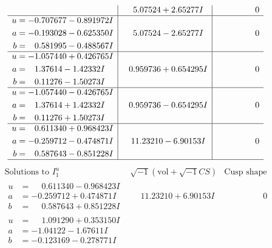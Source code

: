\documentclass[1p]{elsarticle_modified}
\theoremstyle{definition}
\newcommand{\I}{\sqrt{-1}}
\begin{document}
$$\begin{array}{c|c|c}
 & \phantom{-}5.07524 + 2.65277 I & \phantom{-0.000000 } 0 \\ \hline\begin{aligned}
u &= -0.707677 - 0.891972 I \\
a &= -0.193028 - 0.625350 I \\
b &= \phantom{-}0.581995 - 0.488567 I\end{aligned}
 & \phantom{-}5.07524 - 2.65277 I & \phantom{-0.000000 } 0 \\ \hline\begin{aligned}
u &= -1.057440 + 0.426765 I \\
a &= \phantom{-}1.37614 - 1.42332 I \\
b &= \phantom{-}0.11276 - 1.50273 I\end{aligned}
 & \phantom{-}0.959736 + 0.654295 I & \phantom{-0.000000 } 0 \\ \hline\begin{aligned}
u &= -1.057440 - 0.426765 I \\
a &= \phantom{-}1.37614 + 1.42332 I \\
b &= \phantom{-}0.11276 + 1.50273 I\end{aligned}
 & \phantom{-}0.959736 - 0.654295 I & \phantom{-0.000000 } 0 \\ \hline\begin{aligned}
u &= \phantom{-}0.611340 + 0.968423 I \\
a &= -0.259712 - 0.474871 I \\
b &= \phantom{-}0.587643 - 0.851228 I\end{aligned}
 & \phantom{-}11.23210 - 6.90153 I & \phantom{-0.000000 } 0\\
 \hline 
 \end{array}$$\newpage$$\begin{array}{c|c|c}  
\text{Solutions to }I^u_{1}& \I (\text{vol} + \sqrt{-1}CS) & \text{Cusp shape}\\
 \hline 
\begin{aligned}
u &= \phantom{-}0.611340 - 0.968423 I \\
a &= -0.259712 + 0.474871 I \\
b &= \phantom{-}0.587643 + 0.851228 I\end{aligned}
 & \phantom{-}11.23210 + 6.90153 I & \phantom{-0.000000 } 0 \\ \hline\begin{aligned}
u &= \phantom{-}1.091290 + 0.353150 I \\
a &= -1.04122 - 1.67611 I \\
b &= -0.123169 - 0.278771 I\end{aligned}

\end{array}$$
\end{document}
